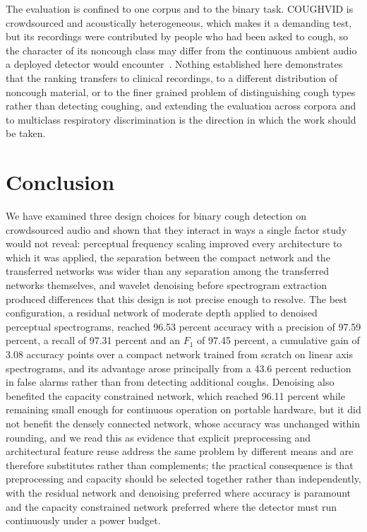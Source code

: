 The evaluation is confined to one corpus and to the binary task. COUGHVID is
crowdsourced and acoustically heterogeneous, which makes it a demanding test,
but its recordings were contributed by people who had been asked to cough, so
the character of its noncough class may differ from the continuous ambient
audio a deployed detector would encounter~\cite{orlandic2021}. Nothing
established here demonstrates that the ranking transfers to clinical
recordings, to a different distribution of noncough material, or to the finer
grained problem of distinguishing cough types rather than detecting coughing,
and extending the evaluation across corpora and to multiclass respiratory
discrimination is the direction in which the work should be taken.

\section{Conclusion}\label{sec:conclusion}

We have examined three design choices for binary cough detection on
crowdsourced audio and shown that they interact in ways a single factor study
would not reveal: perceptual frequency scaling improved every architecture to
which it was applied, the separation between the compact network and the
transferred networks was wider than any separation among the transferred
networks themselves, and wavelet denoising before spectrogram extraction
produced differences that this design is not precise enough to resolve. The best
configuration, a residual network of moderate depth applied to denoised
perceptual spectrograms, reached 96.53 percent accuracy with a precision of
97.59 percent, a recall of 97.31 percent and an $F_1$ of 97.45 percent, a
cumulative gain of 3.08 accuracy points over a compact network trained from
scratch on linear axis spectrograms, and its advantage arose principally from
a 43.6 percent reduction in false alarms rather than from detecting additional
coughs. Denoising also benefited the capacity constrained network, which
reached 96.11 percent while remaining small enough for continuous operation on
portable hardware, but it did not benefit the densely connected network, whose
accuracy was unchanged within rounding, and we read this as evidence that
explicit preprocessing and architectural feature reuse address the same
problem by different means and are therefore substitutes rather than
complements; the practical consequence is that preprocessing and capacity
should be selected together rather than independently, with the residual
network and denoising preferred where accuracy is paramount and the capacity
constrained network preferred where the detector must run continuously under a
power budget.

